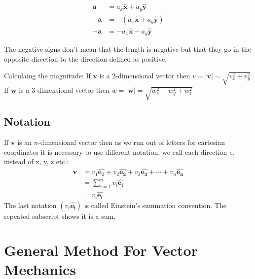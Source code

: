 \documentclass{article}
\newcommand{\vh}[1]{\vec{\hat{#1}}}
\renewcommand{\vec}[1]{\bm{#1}}
\newcommand{\vv}[1]{\vec{#1}}
\begin{document}
\begin{itemize}
\begin{align*}
\vv a&=a_x\vh x+a_y\vh y\\
-\vv a&=-(a_x\vh x+a_y\vh y)\\
-\vv a&=-a_x\vh x-a_y\vh y
\end{align*}

The negative signs don't mean that the length is negative but that they go in the opposite direction to the direction defined as positive.
\end{itemize}

Calculaing the magnitude:
If \(\vv v\) is a 2-dimensional vector then \(v=|\vv v|=\sqrt{v_x^2+v_y^2}\)
If \(\vv w\) is a 3-dimensional vector then \(w=|\vv w|=\sqrt{w_x^2+w_y^2+w_z^2}\)

\subsection*{Notation}

If \(\vv v\) is an \(n\)-dimensional vector then as we run out of letters for cartesian coordinates it is necessary to use different notation, we call each direction \(e_i\) instead of x, y, z etc.:
\begin{align*}
\vv v&=v_1\vh{e_1}+v_2\vh{e_2}+v_3\vh{e_3}+\cdots+v_n\vh{e_n}\\
&=\sum_{i=1}^nv_i\vh{e_i}\\
&=v_i\vh{e_i}
\end{align*}
The last notation \((v_i\vh{e_i})\) is called Einstein's summation convention. The repeated subscript shows it is a sum.

\section{General Method For Vector Mechanics}
\end{document}
